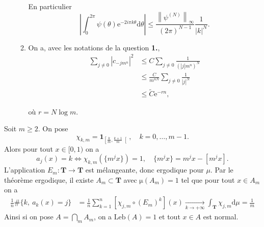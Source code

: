\documentclass[a4paper,12pt,openany]{article}
\theoremstyle{plain}
\theoremstyle{definition}
\newcommand{\e}{\mathrm{e}}
\newcommand{\dd}{\mathrm{d}}
\newcommand{\T}{\mathbf{T}}
\begin{document}
\begin{enumerate}
\begin{enumerate}
En particulier
$$
\left|\int_0^{2\pi} \psi(\theta)\e^{-2i \pi k \theta} \dd \theta\right| \leqslant \frac{\left\|\psi^{(N)}\right\|_\infty}{(2\pi)^{N-1}} \frac{1}{|k|^N}.
$$

\item On a, avec les notations de la question \textbf{1.},
$$
\begin{aligned}
\sum_{j\neq0} |c_{-jm^n}|^2 &\leqslant C \sum_{j\neq 0} \frac{1}{(|j|m^n)^N}  \\
&\leqslant \frac{C}{m^{nN}} \sum_{j \neq 0} \frac{1}{|j|^N}  \\
&\leqslant \tilde C \e^{-rn},
\end{aligned}
$$

o\`u $r = N \log m.$
\end{enumerate}
\end{enumerate}

\vspace{0.6cm}

 \vspace{1.5mm} 

\noindent
Soit $m \geqslant 2$. On pose
$$
\chi_{k,m} = \mathbf{1}_{\left[\frac{k}{m}, \frac{k+1}{m}\right[}, \quad k = 0, \dots, m-1.
$$
Alors pour tout $x \in [0,1)$ on a 
$$
a_j(x) = k \iff \chi_{k,m}(\{m^jx\}) = 1, \quad \{m^jx\} = m^jx - [m^jx].
$$
L'application $E_m : \T \to \T$ est m\'elangeante, donc ergodique pour $\mu$.  Par le th\'eor\`eme ergodique, il existe $A_m \subset \T$ avec $\mathrm{\mu}(A_m) = 1$ tel que pour tout $x \in A_m$ on a
$$
\begin{aligned}
\frac{1}{n} \#\{k,~a_k(x) = j\} &= \frac{1}{n} \sum_{k=1}^n [\chi_{j,m} \circ (E_m)^k] (x)  \underset{k \to +\infty}{\longrightarrow} \int_\T \chi_{j,m} \dd \mu = \frac{1}{m}
\end{aligned}
$$
Ainsi si on pose $A = \bigcap_m A_m$, on a $\mathrm{Leb}(A) = 1$ et tout $x \in A$ est normal.
\vspace{0.6cm}


 \vspace{1.5mm} 
\end{document}
